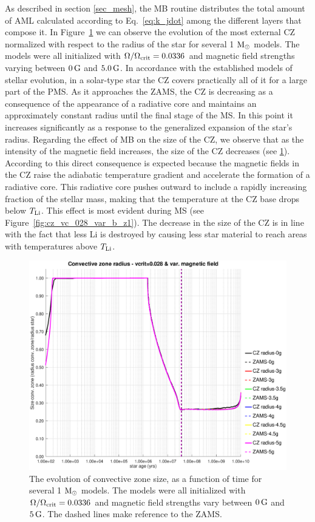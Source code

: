 \documentclass[fleqn,usenatbib]{mnras}
\begin{document}
{{As described in section \ref{sec_mesh}, the MB routine distributes the total amount of AML calculated according to Eq.~\ref{eq:k_jdot} among the different layers that compose it. In Figure~\ref{fig:cz_vc_028_var_b} we can observe the evolution of the most external CZ normalized with respect to the radius of the star for several 1 $\mathrm{M}_\odot$ models. The models were all initialized with $\Omega / \Omega_{\mathrm{crit}}=0.0336$ and magnetic field strengths varying between $0\,\mathrm{G}$ and $5.0\,\mathrm{G}$. In accordance with the established models of stellar evolution, in a solar-type star the CZ covers practically all of it for a large part of the PMS. As it approaches the ZAMS, the CZ is decreasing as a consequence of the appearance of a radiative core and maintains an approximately constant radius until the final stage of the MS. In this point it increases significantly as a response to the generalized expansion of the star's radius. Regarding the effect of MB on the size of the CZ, we observe that as the intensity of the magnetic field increases, the size of the CZ decreases (see \ref{fig:cz_vc_028_var_b}). According to \citet{Jeffries2004} this direct consequence is expected because the magnetic fields in the CZ raise the adiabatic temperature gradient and accelerate the formation of a radiative core. This radiative core pushes outward to include a rapidly increasing fraction of the stellar mass, making that the temperature at the CZ base drops below $T_{\mathrm{Li}}$. This effect is most evident during MS (see Figure~\ref{fig:cz_vc_028_var_b_z1}). The decrease in the size of the CZ is in line with the fact that less Li is destroyed by causing less star material to reach areas with temperatures above $T_{\mathrm{Li}}$.\par

\begin{figure}
	\includegraphics[trim = 30mm 15mm 20mm 15mm, clip,width=\columnwidth]{figures/cz_vc_028_var_g.eps}
    \caption{The evolution of convective zone size, as a function of time for several 1 $\mathrm{M}_\odot$ models. The models were all initialized with $\Omega / \Omega_{\mathrm{crit}}=0.0336$ and magnetic field strengths vary between $0\,\mathrm{G}$ and $5\,\mathrm{G}$. The dashed lines make reference to the ZAMS.}
    \label{fig:cz_vc_028_var_b}
\end{figure}

}}
\end{document}
